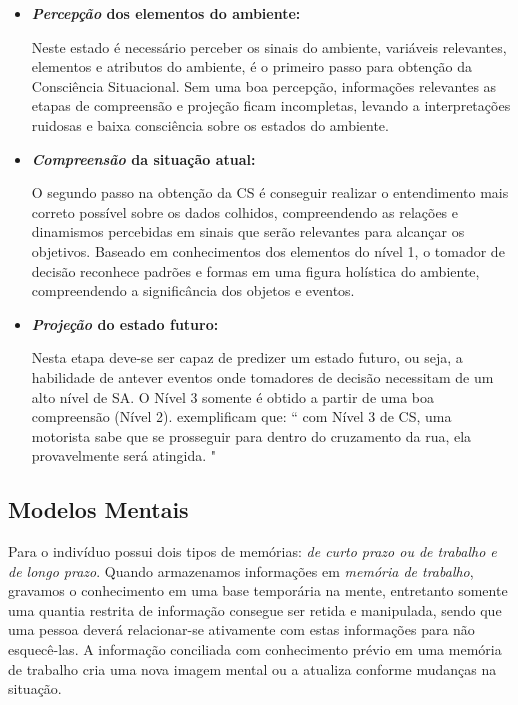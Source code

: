 \documentclass[12pt]{article}
\begin{document}
\begin{itemize}
		
	\item \textbf{\textit{Percepção} dos elementos do ambiente:}
	
	Neste estado é necessário perceber os sinais do ambiente, variáveis relevantes, elementos e atributos do ambiente, é o primeiro passo para obtenção da Consciência Situacional. Sem uma boa percepção, informações relevantes as etapas de compreensão e projeção ficam incompletas, levando a interpretações ruidosas e baixa consciência sobre os estados do ambiente.
	
	\item  \textbf{\textit{Compreensão} da situação atual:}
	
	O segundo passo na obtenção da CS é conseguir realizar o entendimento mais correto possível sobre os dados colhidos, compreendendo as relações e dinamismos percebidas em sinais que serão relevantes para alcançar os objetivos. Baseado em conhecimentos dos elementos do nível 1, o tomador de decisão reconhece padrões e formas em uma figura holística do ambiente, compreendendo a significância dos objetos e eventos.	
	
	\item \textbf{\textit{Projeção} do estado futuro:}
	
	Nesta etapa deve-se ser capaz de predizer um estado futuro, ou seja, a habilidade de antever eventos onde tomadores de decisão necessitam de um alto nível de SA. O Nível 3 somente é obtido a partir de uma boa compreensão (Nível 2). \cite{Endsley2012} exemplificam que: `` com Nível 3 de CS, uma motorista sabe que se prosseguir para dentro do cruzamento da rua, ela provavelmente será atingida. "
	
\end{itemize}

\subsection{Modelos Mentais}

Para \cite{Endsley2012} o indivíduo  possui dois tipos de memórias: \textit{de curto prazo ou de trabalho e de longo prazo}. Quando armazenamos informações em \textit{memória de trabalho}, gravamos o conhecimento em uma base temporária na mente, entretanto somente uma quantia restrita de informação consegue ser retida e manipulada, sendo que uma pessoa deverá relacionar-se ativamente com estas informações para não esquecê-las. A informação conciliada com conhecimento prévio em uma memória de trabalho cria uma nova imagem mental ou a atualiza conforme mudanças na situação. 	
\end{document}
